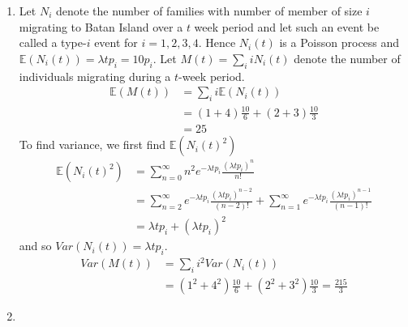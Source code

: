 \documentclass[a4paper,10pt]{article}
\theoremstyle{definition}
\begin{document}
\begin{enumerate}
\item Let $N_i$ denote the number of families with number of member of size $i$ migrating to Batan Island over a $t$ week period and let such an event be called a type-$i$ event for $i=1,2,3,4$. Hence $N_i(t)$ is a Poisson process and $\mathbb{E}(N_i(t))=\lambda t p_i=10p_i$. Let $M(t)=\sum_{i}iN_i(t)$ denote the number of individuals migrating during a $t$-week period. 
\begin{align*}
\mathbb{E}(M(t))&=\sum_{i}i\mathbb{E}(N_i(t))\\
&=(1+4)\frac{10}{6}+(2+3)\frac{10}{3}\\
&=25
\end{align*}
To find variance, we first find $\mathbb{E}(N_i(t)^2)$
\begin{align*}
\mathbb{E}(N_i(t)^2)&=\sum_{n=0}^{\infty}n^2e^{-\lambda t p_i}\frac{(\lambda t p_i)^n}{n!}\\
&=\sum_{n=2}^{\infty}e^{-\lambda t p_i}\frac{(\lambda t p_i)^{n-2}}{(n-2)!}+\sum_{n=1}^{\infty}e^{-\lambda t p_i}\frac{(\lambda t p_i)^{n-1}}{(n-1)!}\\
&=\lambda t p_i+(\lambda t p_i)^2
\end{align*}
and so $Var(N_i(t))=\lambda t p_i$.
\begin{align*}
Var(M(t))&=\sum_{i}i^2Var(N_i(t))\\
&=(1^2+4^2)\frac{10}{6}+(2^2+3^2)\frac{10}{3}=\frac{215}{3}
\end{align*}

\item


\end{enumerate}
\end{document}

